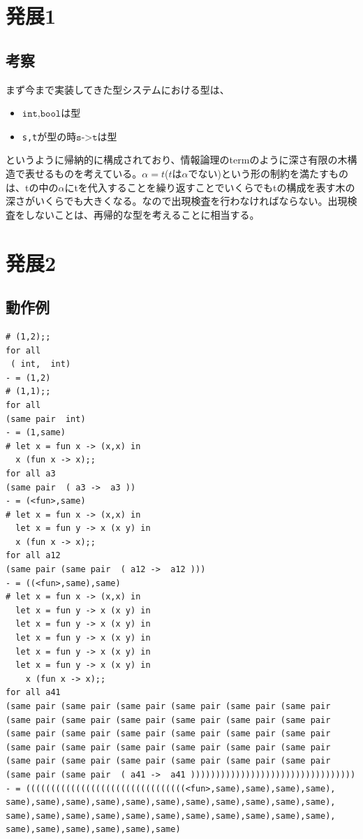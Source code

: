\documentclass[11pt,a4paper]{jsarticle}
\begin{document}
\section*{発展1}
\subsection*{考察}
まず今まで実装してきた型システムにおける型は、
\begin{itemize}
  \item $\texttt{int,bool}$は型
  \item \texttt{s,t}が型の時$\texttt{s->t}$は型
\end{itemize}
というように帰納的に構成されており、情報論理のtermのように深さ有限の木構造で表せるものを考えている。$\alpha=t$($t$は$\alpha$でない)という形の制約を満たすものは、tの中の$\alpha$にtを代入することを繰り返すことでいくらでもtの構成を表す木の深さがいくらでも大きくなる。なので出現検査を行わなければならない。出現検査をしないことは、再帰的な型を考えることに相当する。
\section*{発展2}
\subsection*{動作例}
\begin{lstlisting}[basicstyle=\ttfamily\footnotesize, frame=single]
# (1,2);;
for all 
 ( int,  int)
- = (1,2)
# (1,1);;
for all 
(same pair  int)
- = (1,same)
# let x = fun x -> (x,x) in
  x (fun x -> x);;
for all a3 
(same pair  ( a3 ->  a3 ))
- = (<fun>,same)
# let x = fun x -> (x,x) in 
  let x = fun y -> x (x y) in
  x (fun x -> x);;
for all a12 
(same pair (same pair  ( a12 ->  a12 )))
- = ((<fun>,same),same)
# let x = fun x -> (x,x) in 
  let x = fun y -> x (x y) in
  let x = fun y -> x (x y) in
  let x = fun y -> x (x y) in
  let x = fun y -> x (x y) in
  let x = fun y -> x (x y) in
    x (fun x -> x);;
for all a41 
(same pair (same pair (same pair (same pair (same pair (same pair 
(same pair (same pair (same pair (same pair (same pair (same pair 
(same pair (same pair (same pair (same pair (same pair (same pair 
(same pair (same pair (same pair (same pair (same pair (same pair 
(same pair (same pair (same pair (same pair (same pair (same pair 
(same pair (same pair  ( a41 ->  a41 )))))))))))))))))))))))))))))))))
- = ((((((((((((((((((((((((((((((((<fun>,same),same),same),same),
same),same),same),same),same),same),same),same),same),same),same),
same),same),same),same),same),same),same),same),same),same),same),
same),same),same),same),same),same)
\end{lstlisting}
\end{document}
